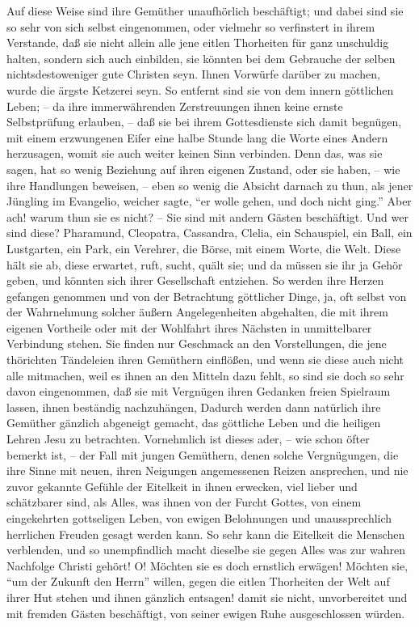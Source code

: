 Auf diese Weise sind ihre Gemüther unaufhörlich beschäftigt; und dabei sind sie so sehr von sich selbst eingenommen, oder vielmehr so verfinstert in ihrem Verstande, daß sie nicht allein alle jene eitlen Thorheiten für ganz unschuldig halten, sondern sich auch einbilden, sie könnten bei dem Gebrauche der selben nichtsdestoweniger gute Christen seyn. Ihnen Vorwürfe darüber zu machen, wurde die ärgste Ketzerei seyn. So entfernt sind sie von dem innern göttlichen Leben; -- da ihre immerwährenden Zerstreuungen ihnen keine ernste Selbstprüfung erlauben, -- daß sie bei ihrem Gottesdienste sich damit begnügen, mit einem erzwungenen Eifer eine halbe Stunde lang die Worte eines Andern herzusagen, womit sie auch weiter keinen Sinn verbinden. Denn das, was sie sagen, hat so wenig Beziehung auf ihren eigenen Zustand, oder sie haben, -- wie ihre Handlungen beweisen, -- eben so wenig die Absicht darnach zu thun, als jener Jüngling im Evangelio, weicher sagte, "`er wolle gehen, und doch nicht ging."' Aber ach! warum thun sie es nicht? -- Sie sind mit andern Gästen beschäftigt. Und wer sind diese? Pharamund, Cleopatra, Cassandra, Clelia, ein Schauspiel, ein Ball, ein Lustgarten, ein Park, ein Verehrer, die Börse, mit einem Worte, die Welt. Diese hält sie ab, diese erwartet, ruft, sucht, quält sie; und da müssen sie ihr ja Gehör geben, und könnten sich ihrer Gesellschaft entziehen. So werden ihre Herzen gefangen genommen und von der Betrachtung göttlicher Dinge, ja, oft selbst von der Wahrnehmung solcher äußern Angelegenheiten abgehalten, die mit ihrem eigenen Vortheile oder mit der Wohlfahrt ihres Nächsten in unmittelbarer Verbindung stehen. Sie finden nur Geschmack an den Vorstellungen, die jene thörichten Tändeleien ihren Gemüthern einflößen, und wenn sie diese auch nicht alle mitmachen, weil es ihnen an den Mitteln dazu fehlt, so sind sie doch so sehr davon eingenommen, daß sie mit Vergnügen ihren Gedanken freien Spielraum lassen, ihnen beständig nachzuhängen, Dadurch werden dann natürlich ihre Gemüther gänzlich abgeneigt gemacht, das göttliche Leben und die heiligen Lehren Jesu zu betrachten. Vornehmlich ist dieses ader, -- wie schon öfter bemerkt ist, -- der Fall mit jungen Gemüthern, denen solche Vergnügungen, die ihre Sinne mit neuen, ihren Neigungen angemessenen Reizen ansprechen, und nie zuvor gekannte Gefühle der Eitelkeit in ihnen erwecken, viel lieber und schätzbarer sind, als Alles, was ihnen von der Furcht Gottes, von einem eingekehrten gottseligen Leben, von ewigen Belohnungen und unaussprechlich herrlichen Freuden gesagt werden kann. So sehr kann die Eitelkeit die Menschen verblenden, und so unempfindlich macht dieselbe sie gegen Alles was zur wahren Nachfolge Christi gehört! O! Möchten sie es doch ernstlich erwägen! Möchten sie, "`um der Zukunft den Herrn"' willen, gegen die eitlen Thorheiten der Welt auf ihrer Hut stehen und ihnen gänzlich entsagen! damit sie nicht, unvorbereitet und mit fremden Gästen beschäftigt, von seiner ewigen Ruhe ausgeschlossen würden.


